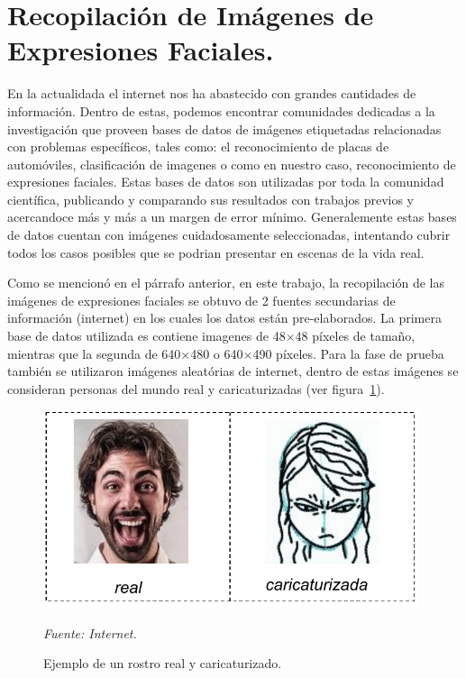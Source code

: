 \section{Recopilación de Imágenes de Expresiones Faciales.}
En la actualidada el internet nos ha abastecido con grandes cantidades de información. Dentro de estas, podemos encontrar comunidades dedicadas a la investigación que proveen bases de datos de imágenes etiquetadas relacionadas con problemas específicos, tales como: el reconocimiento de placas de automóviles, clasificación de imagenes o como en nuestro caso, reconocimiento de expresiones faciales. Estas bases de datos son utilizadas por toda la comunidad científica, publicando y comparando sus resultados con trabajos previos y acercandoce más y más a un margen de error mínimo. Generalemente estas bases de datos cuentan con imágenes cuidadosamente seleccionadas, intentando cubrir todos los casos posibles que se podrian presentar en escenas de la vida real. 

Como se mencionó en el párrafo anterior, en este trabajo, la recopilación de las imágenes de expresiones faciales se obtuvo de 2 fuentes secundarias de información (internet) en los cuales los datos están pre-elaborados. La primera base de datos utilizada es contiene imagenes de 48$\times$48 píxeles de tamaño, mientras que la segunda de 640$\times$480 o 640$\times$490 píxeles. Para la fase de prueba también se utilizaron imágenes aleatórias de internet, dentro de estas imágenes se consideran personas del mundo real y caricaturizadas (ver figura~\ref{fig:caricaturizado}).

\begin{figure}[H]
		\centering
		\includegraphics[width=110mm]{Imagenes/pruebas.pdf}
		\caption{Ejemplo de un rostro real y caricaturizado.}
		\vspace{0.15cm}
		\textit{Fuente: Internet.}
		\label{fig:caricaturizado}
\end{figure}

